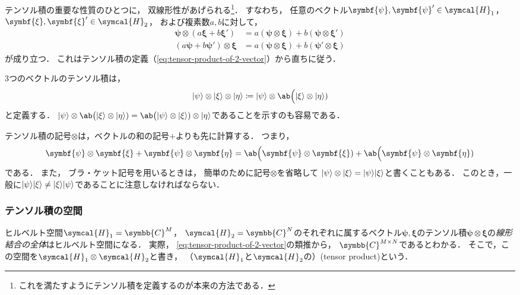 \documentclass[
]{sotsu}
\newcommand{\bpsi}{\symbf{\psi}}
\newcommand{\bxi}{\symbf{\xi}}
\newcommand{\beeta}{\symbf{\eta}}
\begin{document}
\quad 
テンソル積の重要な性質のひとつに，
双線形性があげられる\footnote{
    これを満たすようにテンソル積を定義するのが本来の方法である．
}．
すなわち，
任意のベクトル$\bpsi, \bpsi' \in \symcal{H}_1$，
$\bxi, \bxi' \in \symcal{H}_2$，
および複素数$a, b$に対して，
\begin{subequations}
    \label{eq:tensor-bilinear}
    \begin{align}
        \bpsi \otimes (a \bxi + b \bxi') &= a (\bpsi \otimes \bxi) + b (\bpsi \otimes \bxi')
        \\
        (a \bpsi + b \bpsi') \otimes \bxi &= a (\bpsi \otimes \bxi) + b (\bpsi' \otimes \bxi)
    \end{align}
\end{subequations}
が成り立つ．
これはテンソル積の定義（\cref{eq:tensor-product-of-2-vector}）から直ちに従う．


\quad 
3つのベクトルのテンソル積は，
\begin{equation*}
    \ket{\psi} \otimes \ket{\xi} \otimes \ket{\eta}
        \coloneq \ket{\psi} \otimes \ab\Big(\ket{\xi} \otimes \ket{\eta})
\end{equation*}
と定義する．
\(
    \ket{\psi} \otimes \ab\big(\ket{\xi} \otimes \ket{\eta})
    = \ab\big(\ket{\psi} \otimes \ket{\xi}) \otimes \ket{\eta}
\)であることを示すのも容易である．


\quad 
テンソル積の記号$\otimes$は，ベクトルの和の記号$+$よりも先に計算する．
つまり，
\begin{equation*}
    \bpsi \otimes \bxi + \bpsi \otimes \beeta
    = \ab\Big(\bpsi \otimes \bxi) + \ab\Big(\bpsi \otimes \beeta)
\end{equation*}
である．
また，
ブラ・ケット記号を用いるときは，
簡単のために記号$\otimes$を省略して
\( 
    \ket{\psi} \otimes \ket{\xi} = \ket{\psi} \ket{\xi} 
\)と書くこともある．
このとき，一般に$\ket{\psi} \ket{\xi} \neq \ket{\xi} \ket{\psi}$であることに注意しなければならない．



\subsubsection{テンソル積の空間}

ヒルベルト空間$\symcal{H}_1 = \symbb{C}^M$，
$\symcal{H}_2 = \symbb{C}^N$のそれぞれに属するベクトル$\bpsi, \bxi$のテンソル積$\bpsi \otimes \bxi$の\emph{線形結合の全体}はヒルベルト空間になる．
実際，
\cref{eq:tensor-product-of-2-vector}の類推から，
$\symbb{C}^{M \times N}$であるとわかる．
そこで，この空間を$\symcal{H}_1 \otimes \symcal{H}_2$と書き，
（$\symcal{H}_1$と$\symcal{H}_2$の）(tensor product)という．
\end{document}
